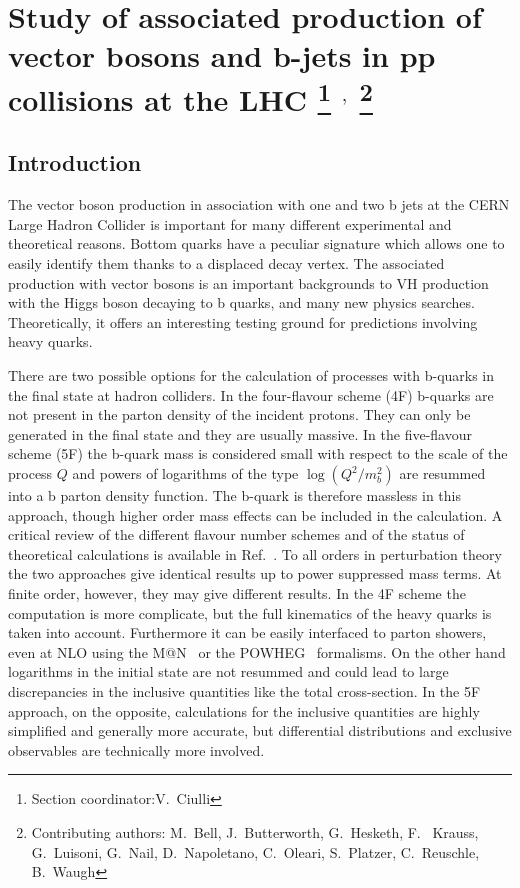 \documentclass[11pt]{cernrep}
\makeatletter
\newcommand{\MCatNLO}{M\protect\scalebox{0.8}{C}@N\protect\scalebox{0.8}{LO}\xspace}
\makeatother
\begin{document}
\section{Study of associated production of vector bosons and b-jets in
  pp collisions at the LHC  \protect\footnote{Section
    coordinator:V.~Ciulli} $^{,}$ \protect\footnote{Contributing authors:
    M.~Bell, J.~Butterworth,
    G.~Hesketh, F. ~Krauss, G.~Luisoni, G.~Nail, D.~Napoletano,
    C.~Oleari, S.~Platzer, C.~Reuschle, B.~Waugh}}

\subsection{Introduction}

The vector boson production in association with one and two b jets at the
CERN Large Hadron Collider is important for many different experimental and
theoretical reasons. Bottom quarks have a peculiar signature which allows one
to easily identify them thanks to a displaced decay vertex. The associated
production with vector bosons is an important backgrounds to VH production
with the Higgs boson decaying to b quarks, and many new physics
searches. Theoretically, it offers an interesting testing ground for
predictions involving heavy quarks.

There are two possible options for the calculation of processes with b-quarks
in the final state at hadron colliders. In the four-flavour scheme (4F)
b-quarks are not present in the parton density of the incident protons. They
can only be generated in the final state and they are usually massive. In the
five-flavour scheme (5F) the b-quark mass is considered small with respect to
the scale of the process $Q$ and powers of logarithms of the type
$\log(Q^2/m_b^2)$ are resummed into a b parton density function. The
b-quark is therefore massless in this approach, though higher order mass
effects can be included in the calculation. A critical review of the
different flavour number schemes and of the status of theoretical
calculations is available in Ref.~\cite{Maltoni:2012pa}. To all orders
in perturbation theory the two approaches give identical results up to
power suppressed mass terms. At finite order, however, they may give
different results. In the 4F scheme the computation is more
complicate, but the full kinematics of the heavy quarks is taken into
account. Furthermore it can be easily interfaced to parton showers, even at
NLO using the \MCatNLO~\cite{Frixione:2002ik} or the
POWHEG~\cite{Nason:2004rx} formalisms.  On the other hand logarithms in the
initial state are not resummed and could lead to large discrepancies in the
inclusive quantities like the total cross-section. In the 5F approach, on the
opposite, calculations for the inclusive quantities are highly simplified and
generally more accurate, but differential distributions and exclusive
observables are technically more involved.
\end{document}
